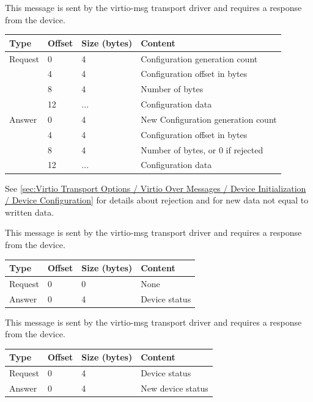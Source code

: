 
This message is sent by the virtio-msg transport driver and requires a
response from the device.

\begin{tabular}{|l|l|l|l|}
\hline
Type & Offset & Size (bytes) & Content \\
\hline \hline
Request & 0 & 4 & Configuration generation count \\
& 4 & 4 & Configuration offset in bytes \\
& 8 & 4 & Number of bytes \\
& 12 & ... & Configuration data \\
\hline
Answer & 0 & 4 & New Configuration generation count \\
& 4 & 4 & Configuration offset in bytes \\
& 8 & 4 &  Number of bytes, or 0 if rejected \\
& 12 & ... & Configuration data \\
\hline
\end{tabular}

See \ref{sec:Virtio Transport Options / Virtio Over Messages / Device Initialization / Device Configuration}
for details about rejection and for new data not equal to written data.


This message is sent by the virtio-msg transport driver and requires a
response from the device.

\begin{tabular}{|l|l|l|l|}
\hline
Type & Offset & Size (bytes) & Content \\
\hline \hline
Request & 0 & 0 & None \\
\hline
Answer & 0 & 4 & Device status \\
\hline
\end{tabular}


This message is sent by the virtio-msg transport driver and requires a
response from the device.

\begin{tabular}{|l|l|l|l|}
\hline
Type & Offset & Size (bytes) & Content \\
\hline \hline
Request & 0 & 4 & Device status \\
\hline
Answer & 0 & 4 & New device status \\
\hline
\end{tabular}

